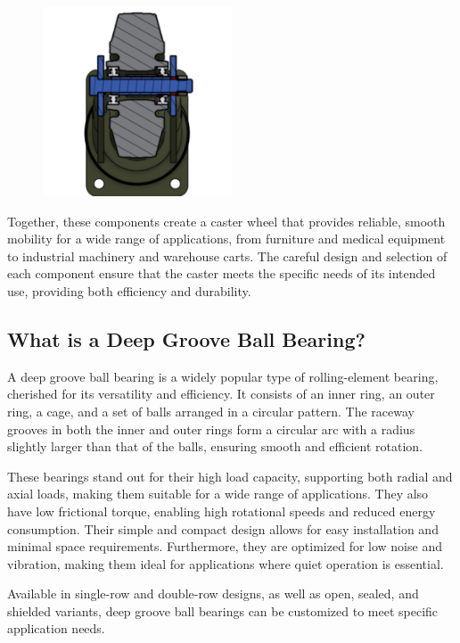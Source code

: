 \documentclass[../../main]{subfiles}
\begin{document}
\begin{figure}[h!]
  \centering
  \includegraphics[width=0.5\textwidth]{img/Picture3.png}
  \caption{}
  \end{figure}

  Together, these components create a caster wheel that provides reliable, smooth mobility for a wide range of applications, from furniture and medical equipment to industrial machinery and warehouse carts. The careful design and selection of each component ensure that the caster meets the specific needs of its intended use, providing both efficiency and durability.

  \subsection{What is a Deep Groove Ball Bearing?}
A deep groove ball bearing is a widely popular type of rolling-element bearing, cherished for its versatility and efficiency. It consists of an inner ring, an outer ring, a cage, and a set of balls arranged in a circular pattern. The raceway grooves in both the inner and outer rings form a circular arc with a radius slightly larger than that of the balls, ensuring smooth and efficient rotation. 

These bearings stand out for their high load capacity, supporting both radial and axial loads, making them suitable for a wide range of applications. They also have low frictional torque, enabling high rotational speeds and reduced energy consumption. Their simple and compact design allows for easy installation and minimal space requirements. Furthermore, they are optimized for low noise and vibration, making them ideal for applications where quiet operation is essential.

Available in single-row and double-row designs, as well as open, sealed, and shielded variants, deep groove ball bearings can be customized to meet specific application needs.
\end{document}
